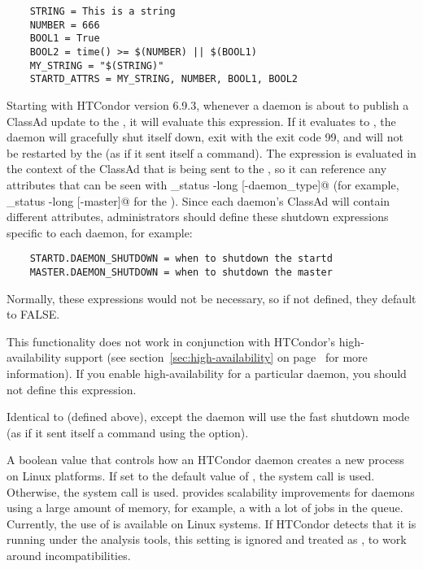 \begin{description}
  \begin{verbatim}
    STRING = This is a string 
    NUMBER = 666
    BOOL1 = True
    BOOL2 = time() >= $(NUMBER) || $(BOOL1)
    MY_STRING = "$(STRING)"
    STARTD_ATTRS = MY_STRING, NUMBER, BOOL1, BOOL2
  \end{verbatim}

\label{param:DaemonShutdown}
\item[\Macro{DAEMON\_SHUTDOWN}]
  Starting with HTCondor version 6.9.3, whenever a daemon is about to
  publish a ClassAd update to the , it will evaluate
  this expression.
  If it evaluates to , the daemon will gracefully shut itself down,
  exit with the exit code 99,
  and will not be restarted by the  (as if it sent
  itself a  command).
  The expression is evaluated in the context of the ClassAd that is
  being sent to the , so it can reference any
  attributes that can be seen with
  \verb@condor_status -long [-daemon_type]@ (for example,
  \verb@condor_status -long [-master]@ for the ).
  Since each daemon's ClassAd will contain different attributes,
  administrators should define these shutdown expressions specific to
  each daemon, for example:
  \begin{verbatim}
    STARTD.DAEMON_SHUTDOWN = when to shutdown the startd
    MASTER.DAEMON_SHUTDOWN = when to shutdown the master
  \end{verbatim}
  Normally, these expressions would not be necessary, so if not
  defined, they default to FALSE.

  \Note This functionality does not work in conjunction with HTCondor's
  high-availability support (see section~\ref{sec:high-availability}
  on page~\pageref{sec:high-availability} for more information).
  If you enable high-availability for a particular daemon, you should
  not define this expression.

\label{param:DaemonShutdownFast}
\item[\Macro{DAEMON\_SHUTDOWN\_FAST}]
  Identical to  (defined above), except the
  daemon will use the fast shutdown mode (as if it sent itself a
   command using the  option).

\label{param:UseCloneToCreateProcesses}
\item[\Macro{USE\_CLONE\_TO\_CREATE\_PROCESSES}]
  A boolean value that controls how an HTCondor daemon creates a new process on
  Linux platforms. If set to the default value of ,
  the  system call is used. Otherwise, the  system
  call is used.  provides scalability improvements for daemons
  using a large amount of memory, for example, a  with a lot of
  jobs in the queue. Currently, the use of  is available on
  Linux systems.  If
  HTCondor detects that it is running under the  analysis tools,
  this setting is ignored and treated as , to work around
  incompatibilities.


\end{description}
